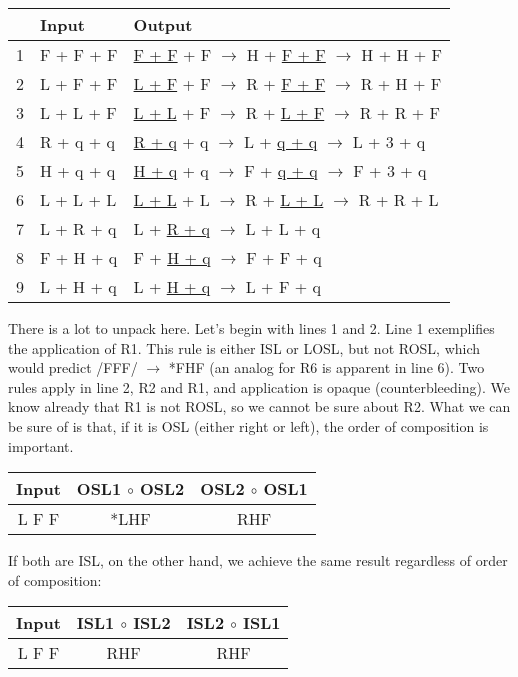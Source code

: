\documentclass{article}
\begin{document}
\begin{exe}
\ex
\renewcommand{\arraystretch}{1.5}
\begin{tabular}[t]{|c|l|l|}
\hline
& Input & Output \\
\hline
1 & F + F + F & \underline{F + F} + F $\rightarrow$ H + \underline{F + F} $\rightarrow$ H + H + F \\
\hline
2 & L + F + F & \underline{L + F} + F $\rightarrow$ R + \underline{F + F} $\rightarrow$ R + H + F \\
\hline
3 & L + L + F & \underline{L + L} + F $\rightarrow$ R + \underline{L + F} $\rightarrow$ R + R + F \\
\hline
4 & R + q + q & \underline{R + q} + q $\rightarrow$ L + \underline{q + q} $\rightarrow$ L + 3 + q \\
\hline
5 & H + q + q & \underline{H + q} + q $\rightarrow$ F + \underline{q + q} $\rightarrow$ F + 3 + q \\
\hline
6 & L + L + L & \underline{L + L} + L $\rightarrow$ R + \underline{L + L} $\rightarrow$ R + R + L \\
\hline
7 & L + R + q & L + \underline{R + q} $\rightarrow$ L + L + q \\
\hline
8 & F + H + q & F + \underline{H + q} $\rightarrow$ F + F + q \\
\hline
9 & L + H + q & L + \underline{H + q} $\rightarrow$ L + F + q \\
\hline
\end{tabular}
\end{exe}
There is a lot to unpack here. Let's begin with lines 1 and 2. Line 1 exemplifies the application of R1. This rule is either ISL or LOSL, but not ROSL, which would predict /FFF/ $\rightarrow$ *FHF (an analog for R6 is apparent in line 6). Two rules apply in line 2, R2 and R1, and application is opaque (counterbleeding). We know already that R1 is not ROSL, so we cannot be sure about R2. What we can be sure of is that, if it is OSL (either right or left), the order of composition is important.
\begin{exe}
\ex
\begin{tabular}[t]{|c|c|c|}
\hline
Input & OSL1 $\circ$ OSL2 & OSL2 $\circ$ OSL1 \\
\hline
L F F & *LHF & RHF \\ 
\hline
\end{tabular}
\end{exe}
If both are ISL, on the other hand, we achieve the same result regardless of order of composition:
\begin{exe}
\ex
\begin{tabular}[t]{|c|c|c|}
\hline
Input & ISL1 $\circ$ ISL2 & ISL2 $\circ$ ISL1 \\
\hline
L F F & RHF & RHF \\ 
\hline
\end{tabular}
\end{exe}
\end{document}
